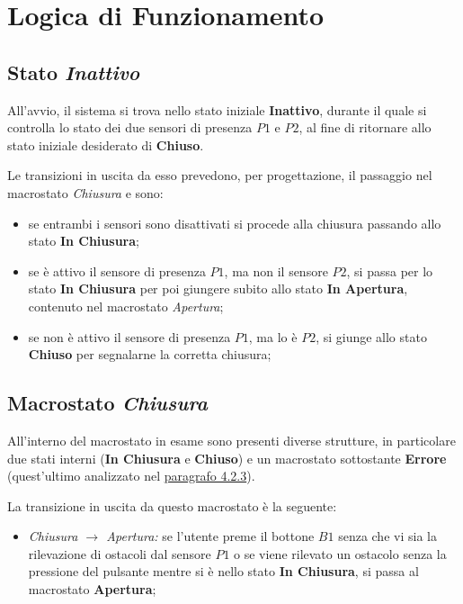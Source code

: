 \section{Logica di Funzionamento}

\subsection{Stato \textit{Inattivo}}
    All'avvio, il sistema si trova nello stato iniziale \textbf{Inattivo}, durante il quale si controlla lo stato dei due sensori di presenza $P1$ e $P2$, al fine di ritornare allo stato iniziale desiderato di \textbf{Chiuso}.
    
    \noindent Le transizioni in uscita da esso prevedono, per progettazione, il passaggio nel macrostato \textit{Chiusura} e sono:
    
    \begin{itemize}
        \item se entrambi i sensori sono disattivati si procede alla chiusura passando allo stato \textbf{In Chiusura};
        
        \item se è attivo il sensore di presenza $P1$, ma non il sensore $P2$, si passa per lo stato \textbf{In Chiusura} per poi giungere subito allo stato \textbf{In Apertura}, contenuto nel macrostato \textit{Apertura};
        
        \item se non è attivo il sensore di presenza $P1$, ma lo è $P2$, si giunge allo stato \textbf{Chiuso} per segnalarne la corretta chiusura;
    \end{itemize}


\subsection{Macrostato \textit{Chiusura}}
    All'interno del macrostato in esame sono presenti diverse strutture, in particolare due stati interni (\textbf{In Chiusura} e \textbf{Chiuso}) e un macrostato sottostante \textbf{Errore} (quest'ultimo analizzato nel \hyperref[macrostato-errore]{paragrafo 4.2.3}).
    
    \noindent La transizione in uscita da questo macrostato è la seguente:
    \begin{itemize}
        \item \textit{Chiusura $\rightarrow$ Apertura:} se l'utente preme il bottone $B1$ senza che vi sia la rilevazione di ostacoli dal sensore $P1$ o se viene rilevato un ostacolo senza la pressione del pulsante mentre si è nello stato \textbf{In Chiusura}, si passa al macrostato \textbf{Apertura};
    \end{itemize}

